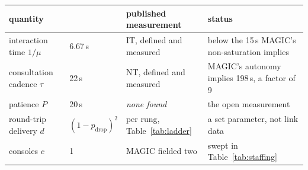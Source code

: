 \begin{tabular}{@{}p{}p{}p{}p{}@{}}
\toprule
quantity & \sandtable{} & published measurement & status \\
\midrule
interaction time $1/\mu$ & 6.67\,s & IT, defined and measured \citep{olsen2004fanout,cummings2008predicting} & below the 15\,s MAGIC's non-saturation implies \\
consultation cadence $\tau$ & 22\,s & NT, defined and measured \citep{olsen2004fanout} & MAGIC's autonomy implies 198\,s, a factor of 9 \\
patience $P$ & 20\,s & \emph{none found} & the open measurement \\
round-trip delivery $d$ & $(1-p_{\text{drop}})^2$ & per rung, Table~\ref{tab:ladder} & a set parameter, not link data \\
consoles $c$ & 1 & MAGIC fielded two \citep{olson2012magic} & swept in Table~\ref{tab:staffing} \\
\bottomrule
\end{tabular}

